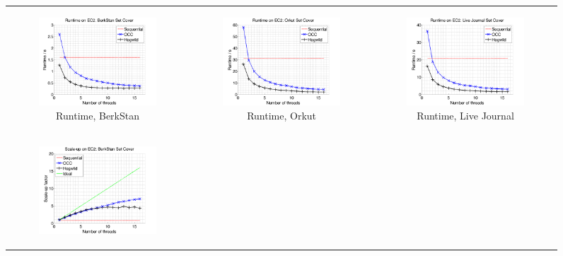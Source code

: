 \documentclass{article} %
\begin{document}
\begin{figure}[ht]
  \centering
  \begin{tabular}{ccc}
	  \begin{subfigure}[b]{0.31\textwidth}
	  	\includegraphics[width=150pt]{images/runtime_webberkstan_setcover.png}
			\caption{Runtime, BerkStan}
			\label{fig:runtime_webberkstan_setcover}
	  \end{subfigure} &
	  \begin{subfigure}[b]{0.31\textwidth}
	  	\includegraphics[width=150pt]{images/runtime_orkut_setcover.png}
			\caption{Runtime, Orkut}
			\label{fig:runtime_orkut_setcover}
	  \end{subfigure} &
	  \begin{subfigure}[b]{0.31\textwidth}
	  	\includegraphics[width=150pt]{images/runtime_livejournal_setcover.png}
			\caption{Runtime, Live Journal}
			\label{fig:runtime_livejournal_setcover}
	  \end{subfigure} \\
	  \begin{subfigure}[b]{0.31\textwidth}
	  	\includegraphics[width=150pt]{images/scaleup_webberkstan_setcover.png}

\end{subfigure}
\end{tabular}
\end{figure}
\end{document}
